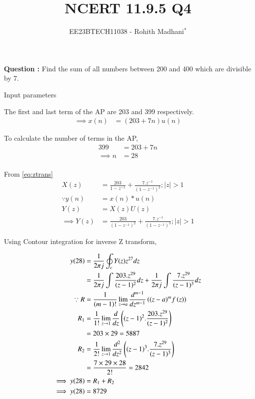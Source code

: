 \documentclass[journal,12pt,twocolumn]{IEEEtran}
\theoremstyle{remark}
\begin{document}

\vspace{3cm}

\title{NCERT 11.9.5 Q4}
\author{EE23BTECH11038 - Rohith Madhani$^{*}$%
}
\maketitle
\newpage
\bigskip
\renewcommand{\thefigure}{\theenumi}
\renewcommand{\thetable}{\theenumi}

\textbf{Question :} Find the sum of all numbers between 200 and 400 which are divisible by 7.\\
\solution 

\begin{table}[!h] 
\centering

\caption{Input parameters}
\label{table:11.9.5.4}
\end{table}

The first and last term of the AP are 203 and 399 respectively.
\begin{align}
    \implies x(n) &= (203 + 7n)u(n) 
\end{align}

To calculate the number of terms in the AP,
\begin{align}
    399 &= 203 + 7n \\
    \implies n &= 28 \\
\end{align}

From \eqref{eq:ztrans}
\begin{align}
    X(z) &= \frac{203}{1-z^{-1}} + \frac{7.z^{-1}}{(1-z^{-1})^2} ; |z|>1 \\
    \because y(n) &= x(n)*u(n) \\
    Y(z) &= X(z)U(z) \\
    \implies Y(z) &= \frac{203}{(1-z^{-1})^2} + \frac{7.z^{-1}}{(1-z^{-1})^3} ; |z|>1 
\end{align}

Using Contour integration for inverse Z transform,

\begin{align}
    y(28) &= \frac{1}{2\pi j}\oint_c Y(z) z^{27} dz \\
    &= \frac{1}{2\pi j}\int \frac{203.z^{29}}{(z-1)^{2}} dz + \frac{1}{2\pi j}\int \frac{7.z^{29}}{(z-1)^{3}} dz\\
    \because R&=\frac{1}{\left(m-1\right)!}\lim\limits_{z\to a}\frac{d^{m-1}}{dz^{m-1}}\left({(z-a)}^{m}f\left(z\right)\right)\\
    R_1 &=\frac{1}{1!}\lim\limits_{z\to 1}\frac{d}{dz}\left((z-1)^2.\frac{203.z^{29}}{(z-1)^{2}}\right)\\
    &= 203 \times 29 = 5887 \\
    R_2 &=\frac{1}{2!}\lim\limits_{z\to 1}\frac{d^2}{dz^2}\left((z-1)^3.\frac{7.z^{29}}{(z-1)^{3}}\right)\\
    &= \frac{7 \times 29 \times 28}{2!} = 2842\\
    \implies y(28) &= R_1 + R_2 \\
    \implies y(28) &= 8729 
\end{align}
\end{document}
